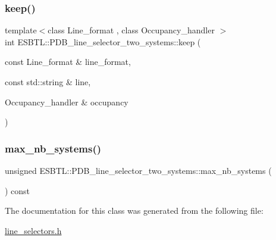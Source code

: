 \subsubsection{\texorpdfstring{keep()}{keep()}}
{\footnotesize\ttfamily template$<$class Line\+\_\+format , class Occupancy\+\_\+handler $>$ \\
int E\+S\+B\+T\+L\+::\+P\+D\+B\+\_\+line\+\_\+selector\+\_\+two\+\_\+systems\+::keep (\begin{DoxyParamCaption}\item[{const Line\+\_\+format \&}]{line\+\_\+format,  }\item[{const std\+::string \&}]{line,  }\item[{Occupancy\+\_\+handler \&}]{occupancy }\end{DoxyParamCaption})\hspace{0.3cm}{\ttfamily [inline]}}

\mbox{\label{classESBTL_1_1PDB__line__selector__two__systems_acaf518ddf669d4ceeb4fce3a6a5bb75a}} 
\subsubsection{\texorpdfstring{max\+\_\+nb\+\_\+systems()}{max\_nb\_systems()}}
{\footnotesize\ttfamily unsigned E\+S\+B\+T\+L\+::\+P\+D\+B\+\_\+line\+\_\+selector\+\_\+two\+\_\+systems\+::max\+\_\+nb\+\_\+systems (\begin{DoxyParamCaption}{ }\end{DoxyParamCaption}) const\hspace{0.3cm}{\ttfamily [inline]}}



The documentation for this class was generated from the following file\+:\begin{DoxyCompactItemize}
\item 
\hyperlink{line__selectors_8h}{line\+\_\+selectors.\+h}\end{DoxyCompactItemize}
